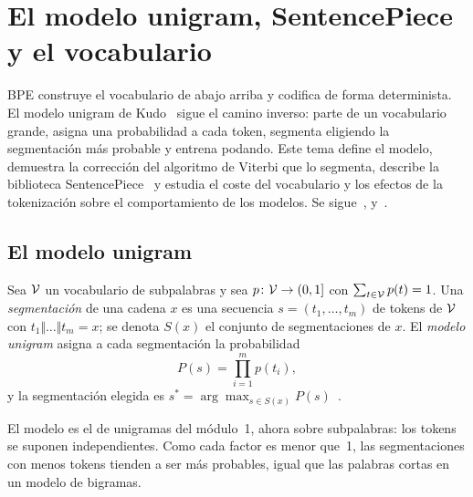 \chapter{El modelo unigram, SentencePiece y el vocabulario}
\label{tema:3}

BPE construye el vocabulario de abajo arriba y codifica de forma determinista. El modelo unigram de Kudo~\cite{kudo} sigue el camino inverso: parte de un vocabulario grande, asigna una probabilidad a cada token, segmenta eligiendo la segmentación más probable y entrena podando. Este tema define el modelo, demuestra la corrección del algoritmo de Viterbi que lo segmenta, describe la biblioteca SentencePiece~\cite{sentencepiece} y estudia el coste del vocabulario y los efectos de la tokenización sobre el comportamiento de los modelos. Se sigue~\cite[§3.2--3.4]{kudo}, \cite[§3]{sentencepiece} y~\cite[§2.4.3]{jm3}.

\section{El modelo unigram}

\begin{definicion}\label{def:unigram}
Sea $\mathcal{V}$ un vocabulario de subpalabras y sea $p\colon\mathcal{V}\to(0,1]$ con $\sum_{t\in\mathcal{V}}p(t)=1$. Una \emph{segmentación} de una cadena $x$ es una secuencia $s=(t_1,\dots,t_m)$ de tokens de $\mathcal{V}$ con $t_1\Vert\dots\Vert t_m=x$; se denota $S(x)$ el conjunto de segmentaciones de $x$. El \emph{modelo unigram} asigna a cada segmentación la probabilidad
\[
P(s)=\prod_{i=1}^{m}p(t_i),
\]
y la segmentación elegida es $s^{*}=\arg\max_{s\in S(x)}P(s)$~\cite[§3.2]{kudo}.
\end{definicion}

El modelo es el de unigramas del módulo~1, ahora sobre subpalabras: los tokens se suponen independientes. Como cada factor es menor que~1, las segmentaciones con menos tokens tienden a ser más probables, igual que las palabras cortas en un modelo de bigramas.

\addtocounter{definicion}{1}%

